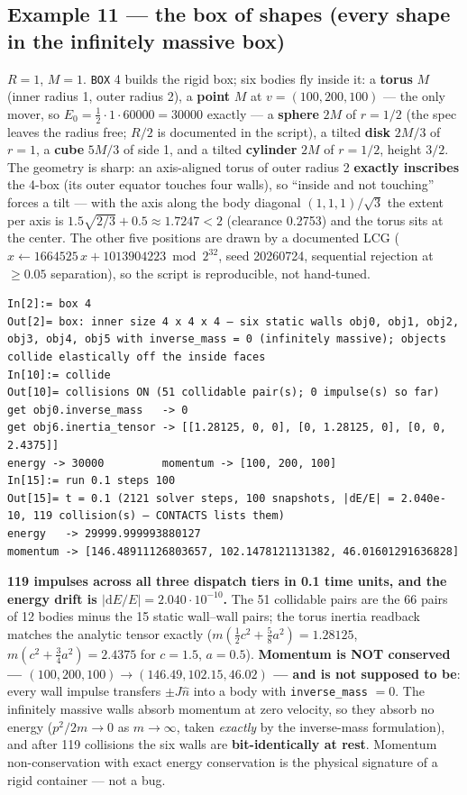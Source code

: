 \documentclass[11pt]{article}
\newcommand{\kw}[1]{\texttt{\uppercase{#1}}}
\newcommand{\code}[1]{\texttt{#1}}
\begin{document}
\subsection{Example 11 --- the box of shapes (every shape in the infinitely
massive box)}
$R = 1$, $M = 1$. \kw{box} 4 builds the rigid box; six bodies fly inside it:
a \textbf{torus} $M$ (inner radius 1, outer radius 2), a \textbf{point} $M$
at $v = (100, 200, 100)$ --- the only mover, so
$E_0 = \tfrac12 \cdot 1 \cdot 60000 = 30000$ exactly --- a \textbf{sphere}
$2M$ of $r = 1/2$ (the spec leaves the radius free; $R/2$ is documented in
the script), a tilted \textbf{disk} $2M/3$ of $r = 1$, a \textbf{cube}
$5M/3$ of side 1, and a tilted \textbf{cylinder} $2M$ of $r = 1/2$, height
$3/2$. The geometry is sharp: an axis-aligned torus of outer radius 2
\textbf{exactly inscribes} the 4-box (its outer equator touches four walls),
so ``inside and not touching'' forces a tilt --- with the axis along the
body diagonal $(1,1,1)/\sqrt3$ the extent per axis is
$1.5\sqrt{2/3} + 0.5 \approx 1.7247 < 2$ (clearance 0.2753) and the torus
sits at the center. The other five positions are drawn by a documented LCG
($x \leftarrow 1664525\,x + 1013904223 \bmod 2^{32}$, seed 20260724,
sequential rejection at $\ge 0.05$ separation), so the script is
reproducible, not hand-tuned.
\begin{lstlisting}
In[2]:= box 4
Out[2]= box: inner size 4 x 4 x 4 — six static walls obj0, obj1, obj2, obj3, obj4, obj5 with inverse_mass = 0 (infinitely massive); objects collide elastically off the inside faces
In[10]:= collide
Out[10]= collisions ON (51 collidable pair(s); 0 impulse(s) so far)
get obj0.inverse_mass   -> 0
get obj6.inertia_tensor -> [[1.28125, 0, 0], [0, 1.28125, 0], [0, 0, 2.4375]]
energy -> 30000         momentum -> [100, 200, 100]
In[15]:= run 0.1 steps 100
Out[15]= t = 0.1 (2121 solver steps, 100 snapshots, |dE/E| = 2.040e-10, 119 collision(s) — CONTACTS lists them)
energy   -> 29999.999993880127
momentum -> [146.48911126803657, 102.1478121131382, 46.01601291636828]
\end{lstlisting}
\textbf{119 impulses across all three dispatch tiers in 0.1 time units, and
the energy drift is $|\mathrm dE/E| = 2.040 \cdot 10^{-10}$.} The 51
collidable pairs are the 66 pairs of 12 bodies minus the 15 static
wall--wall pairs; the torus inertia readback matches the analytic tensor
exactly ($m(\tfrac12 c^2 + \tfrac58 a^2) = 1.28125$,
$m(c^2 + \tfrac34 a^2) = 2.4375$ for $c = 1.5$, $a = 0.5$).
\textbf{Momentum is NOT conserved --- $(100, 200, 100) \to
(146.49, 102.15, 46.02)$ --- and is not supposed to be}: every wall impulse
transfers $\pm J\hat n$ into a body with \code{inverse\_mass} $= 0$. The
infinitely massive walls absorb momentum at zero velocity, so they absorb no
energy ($p^2/2m \to 0$ as $m \to \infty$, taken \emph{exactly} by the
inverse-mass formulation), and after 119 collisions the six walls are
\textbf{bit-identically at rest}. Momentum non-conservation with exact
energy conservation is the physical signature of a rigid container --- not a
bug.
\end{document}
